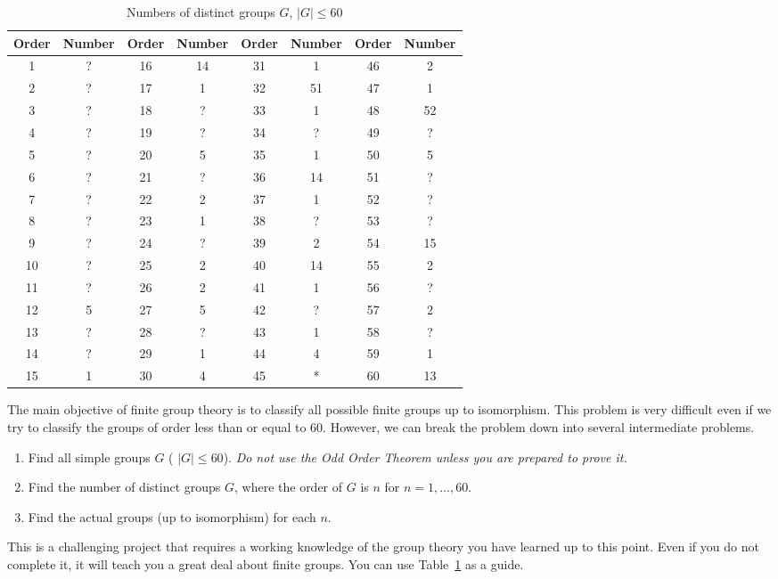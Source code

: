  
\begin{table}[htb]
{\small
\begin{center}
\begin{tabular}{|cc|cc|cc|cc|}
\hline
Order & Number & Order & Number & Order & Number & Order &
Number \\
\hline
1  & ?  & 16 & 14 & 31 & 1  & 46 & 2  \\
2  & ?  & 17 & 1  & 32 & 51 & 47 & 1  \\
3  & ?  & 18 & ?  & 33 & 1  & 48 & 52 \\
4  & ?  & 19 & ?  & 34 & ?  & 49 & ?  \\
5  & ?  & 20 & 5  & 35 & 1  & 50 & 5  \\
6  & ?  & 21 & ?  & 36 & 14 & 51 & ?  \\
7  & ?  & 22 & 2  & 37 & 1  & 52 & ?  \\
8  & ?  & 23 & 1  & 38 & ?  & 53 & ?  \\
9  & ?  & 24 & ?  & 39 & 2  & 54 & 15 \\
10 & ?  & 25 & 2  & 40 & 14 & 55 & 2  \\
11 & ?  & 26 & 2  & 41 & 1  & 56 & ?  \\
12 & 5  & 27 & 5  & 42 & ?  & 57 & 2  \\
13 & ?  & 28 & ?  & 43 & 1  & 58 & ?  \\
14 & ?  & 29 & 1  & 44 & 4  & 59 & 1  \\
15 & 1  & 30 & 4  & 45 & *  & 60 & 13 \\
\hline
\end{tabular}
\caption{Numbers of distinct groups $G$, $|G| \leq 60$ }
\end{center}}\label{sylow:project}
\end{table}
 
 
{\small
 
\noindent 
The main objective of finite group theory is to classify all possible
finite groups up to isomorphism.  This problem is very difficult even
if we try to classify the groups of order less than or equal to 60.
However, we can break the problem down into several intermediate
problems. 
\begin{enumerate}
 
\item
Find all simple groups $G$ ( $|G| \leq 60$). {\em Do not use the Odd
Order Theorem unless you are prepared to prove it.}
 
\item
Find the number of distinct groups $G$, where the order of $G$ is $n$
for $n = 1, \ldots, 60$. 
 
\item
Find the  actual groups (up to isomorphism) for each $n$.
 
\end{enumerate}
This is a challenging project that requires a working knowledge of the
group theory you have learned up to this point. Even if you do
not complete it, it will teach you a great deal about finite groups. You
can use Table~\ref{sylow:project} as a guide. 
}
 
